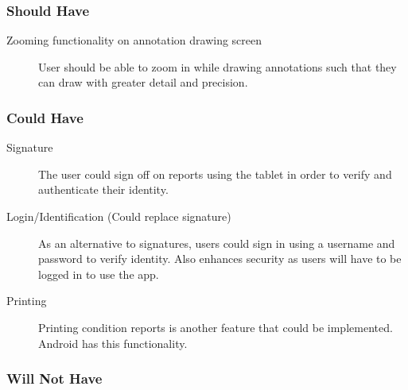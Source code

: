 \documentclass[12pt]{article}
\begin{document}
\subsubsection{Should Have}
\begin{description}
\item [Zooming functionality on annotation drawing screen]
User should be able to zoom in while drawing annotations such that they can draw with greater detail and precision.
\end{description}
\subsubsection{Could Have}
\begin{description}
\item [Signature]
The user could sign off on reports using the tablet in order to verify and authenticate their identity.

\item [Login/Identification (Could replace signature)]
As an alternative to signatures, users could sign in using a username and password to verify identity. Also enhances security as users will have to be logged in to use the app.

\item [Printing]
Printing condition reports is another feature that could be implemented. Android has this functionality.
\end{description}
\subsubsection{Will Not Have}
\end{document}

